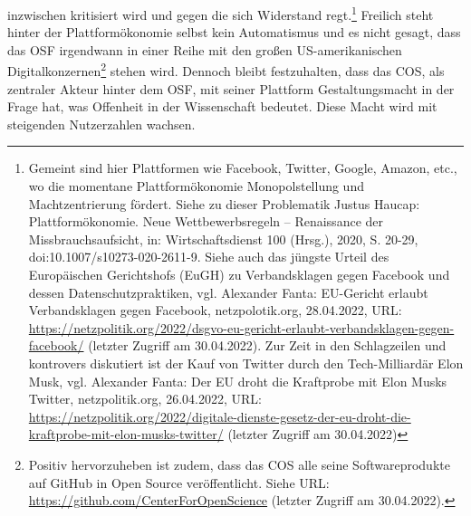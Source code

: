\begin{enumerate}
inzwischen kritisiert wird und gegen die sich Widerstand regt.\footnote{Gemeint sind hier Plattformen wie Facebook, Twitter, Google, Amazon, etc., wo die momentane Plattformökonomie Monopolstellung und Machtzentrierung fördert. Siehe zu dieser Problematik Justus Haucap: Plattformökonomie. Neue Wettbewerbsregeln –
Renaissance der Missbrauchsaufsicht, in: Wirtschaftsdienst 100 (Hrsg.), 2020, S. 20-29, doi:10.1007/s10273-020-2611-9. Siehe auch das jüngste Urteil des Europäischen Gerichtshofs (EuGH) zu Verbandsklagen gegen Facebook und dessen Datenschutzpraktiken, vgl. Alexander Fanta: EU-Gericht erlaubt Verbandsklagen gegen Facebook, netzpolotik.org, 28.04.2022, URL: \url{https://netzpolitik.org/2022/dsgvo-eu-gericht-erlaubt-verbandsklagen-gegen-facebook/} (letzter Zugriff am 30.04.2022). Zur Zeit in den Schlagzeilen und kontrovers diskutiert ist der Kauf von Twitter durch den Tech-Milliardär Elon Musk, vgl. Alexander Fanta: Der EU droht die Kraftprobe mit Elon Musks Twitter, netzpolitik.org, 26.04.2022, URL: \url{https://netzpolitik.org/2022/digitale-dienste-gesetz-der-eu-droht-die-kraftprobe-mit-elon-musks-twitter/} (letzter Zugriff am 30.04.2022)} Freilich steht hinter der Plattformökonomie selbst kein Automatismus und es nicht gesagt, dass das OSF irgendwann in einer Reihe mit den großen US-amerikanischen Digitalkonzernen\footnote{Positiv hervorzuheben ist zudem, dass das COS alle seine Softwareprodukte auf GitHub in Open Source veröffentlicht. Siehe URL: \url{https://github.com/CenterForOpenScience} (letzter Zugriff am 30.04.2022).} stehen wird. Dennoch bleibt festzuhalten, dass das COS, als zentraler Akteur hinter dem OSF, mit seiner Plattform Gestaltungsmacht in der Frage hat, was Offenheit in der Wissenschaft bedeutet. Diese Macht wird mit steigenden Nutzerzahlen wachsen.


\end{enumerate}

